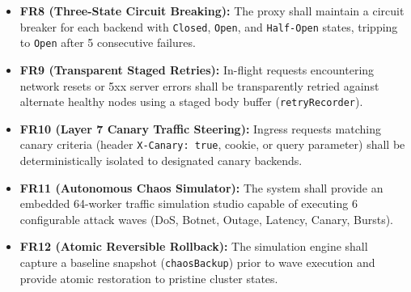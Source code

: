 \documentclass[12pt,openany]{report}
\begin{document}
\begin{itemize}
  \item \textbf{FR8 (Three-State Circuit Breaking):} The proxy shall maintain a circuit breaker for each backend with \texttt{Closed}, \texttt{Open}, and \texttt{Half-Open} states, tripping to \texttt{Open} after 5 consecutive failures.
  \item \textbf{FR9 (Transparent Staged Retries):} In-flight requests encountering network resets or 5xx server errors shall be transparently retried against alternate healthy nodes using a staged body buffer (\texttt{retryRecorder}).
  \item \textbf{FR10 (Layer 7 Canary Traffic Steering):} Ingress requests matching canary criteria (header \texttt{X-Canary: true}, cookie, or query parameter) shall be deterministically isolated to designated canary backends.
  \item \textbf{FR11 (Autonomous Chaos Simulator):} The system shall provide an embedded 64-worker traffic simulation studio capable of executing 6 configurable attack waves (DoS, Botnet, Outage, Latency, Canary, Bursts).
  \item \textbf{FR12 (Atomic Reversible Rollback):} The simulation engine shall capture a baseline snapshot (\texttt{chaosBackup}) prior to wave execution and provide atomic restoration to pristine cluster states.
\end{itemize}
\end{document}

